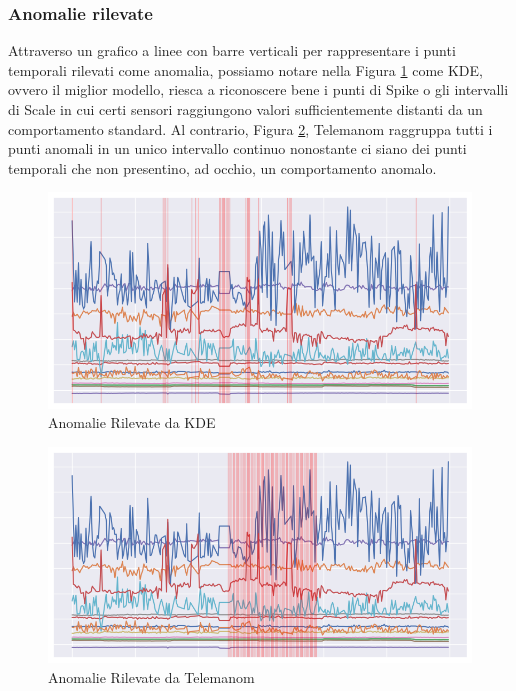 \subsubsection{Anomalie rilevate}
Attraverso un grafico a linee con barre verticali per rappresentare i punti temporali rilevati come anomalia, possiamo notare nella Figura \ref{kde} come KDE, ovvero il miglior modello, riesca a riconoscere bene i punti di Spike o gli intervalli di Scale in cui certi sensori raggiungono valori sufficientemente distanti da un comportamento standard. Al contrario, Figura \ref{worst_clf}, Telemanom raggruppa tutti i punti anomali in un unico intervallo continuo nonostante ci siano dei punti temporali che non presentino, ad occhio, un comportamento anomalo.

\begin{figure}[t]
	\centering
	\includegraphics[width=14cm, scale=1]{images/kde}
	\caption{Anomalie Rilevate da KDE}
	\label{kde}
	
\end{figure}

\begin{figure}[t]
	\centering
	\includegraphics[width=14cm, scale=1]{images/worst_clf}
	\caption{Anomalie Rilevate da Telemanom}
	\label{worst_clf}
	
\end{figure}

